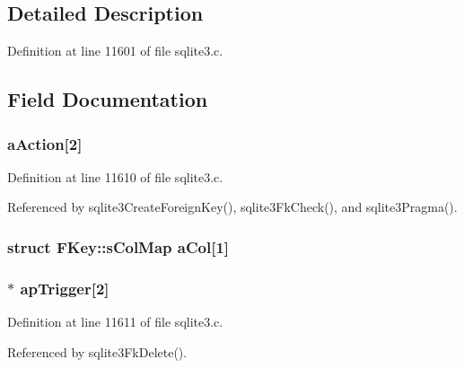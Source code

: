 \subsection{Detailed Description}


Definition at line 11601 of file sqlite3.\+c.



\subsection{Field Documentation}
\hypertarget{struct_f_key_a3368c776d894b09143824e0257497c7d}{}
\subsubsection[{a\+Action}]{ a\+Action\mbox{[}2\mbox{]}}\label{struct_f_key_a3368c776d894b09143824e0257497c7d}


Definition at line 11610 of file sqlite3.\+c.



Referenced by sqlite3\+Create\+Foreign\+Key(), sqlite3\+Fk\+Check(), and sqlite3\+Pragma().

\hypertarget{struct_f_key_a0a3363a8d4b79b754bc4b6566fa64d3b}{}
\subsubsection[{a\+Col}]{\setlength{\rightskip}{0pt plus 5cm}struct {\bf F\+Key\+::s\+Col\+Map}  a\+Col\mbox{[}1\mbox{]}}\label{struct_f_key_a0a3363a8d4b79b754bc4b6566fa64d3b}
\hypertarget{struct_f_key_afa7faa6dac9fc2f244023e14e121906b}{}
\subsubsection[{ap\+Trigger}]{$\ast$ ap\+Trigger\mbox{[}2\mbox{]}}\label{struct_f_key_afa7faa6dac9fc2f244023e14e121906b}


Definition at line 11611 of file sqlite3.\+c.



Referenced by sqlite3\+Fk\+Delete().

\hypertarget{struct_f_key_a05adbc8674f021661354ad607d00b0ac}{}
